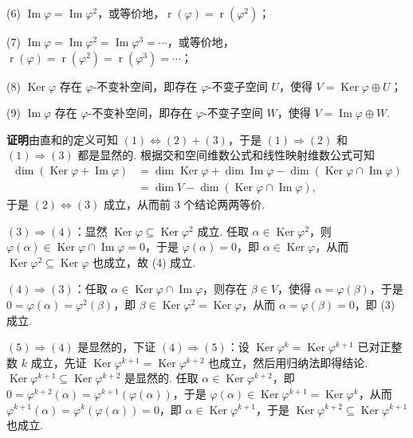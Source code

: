 \documentclass[UTF8,12pt,a4paper,fontset=fandol]{ctexart}
\begin{document}
(6) $\operatorname{Im}\varphi=\operatorname{Im}\varphi^2$，或等价地，$\operatorname{r}(\varphi)=\operatorname{r}(\varphi^2)$；

(7) $\operatorname{Im}\varphi=\operatorname{Im}\varphi^2=\operatorname{Im}\varphi^3=\cdots$，或等价地，$\operatorname{r}(\varphi)=\operatorname{r}(\varphi^2)=\operatorname{r}(\varphi^3)=\cdots$；

(8) $\operatorname{Ker}\varphi$ 存在 $\varphi$-不变补空间，即存在 $\varphi$-不变子空间 $U$，使得 $V=\operatorname{Ker}\varphi\oplus U$；

(9) $\operatorname{Im}\varphi$ 存在 $\varphi$-不变补空间，即存在 $\varphi$-不变子空间 $W$，使得 $V=\operatorname{Im}\varphi\oplus W$.

\noindent\textbf{证明}\quad 由直和的定义可知 $(1)\Leftrightarrow(2)+(3)$，于是 $(1)\Rightarrow(2)$ 和 $(1)\Rightarrow(3)$ 都是显然的. 根据交和空间维数公式和线性映射维数公式可知
\[
\begin{aligned}
\dim(\operatorname{Ker}\varphi+\operatorname{Im}\varphi)
&=\dim\operatorname{Ker}\varphi+\dim\operatorname{Im}\varphi-\dim(\operatorname{Ker}\varphi\cap\operatorname{Im}\varphi)\\
&=\dim V-\dim(\operatorname{Ker}\varphi\cap\operatorname{Im}\varphi),
\end{aligned}
\]
于是 $(2)\Leftrightarrow(3)$ 成立，从而前 3 个结论两两等价.

$(3)\Rightarrow(4)$：显然 $\operatorname{Ker}\varphi\subseteq\operatorname{Ker}\varphi^2$ 成立. 任取 $\alpha\in\operatorname{Ker}\varphi^2$，则 $\varphi(\alpha)\in\operatorname{Ker}\varphi\cap\operatorname{Im}\varphi=0$，于是 $\varphi(\alpha)=0$，即 $\alpha\in\operatorname{Ker}\varphi$，从而 $\operatorname{Ker}\varphi^2\subseteq\operatorname{Ker}\varphi$ 也成立，故 (4) 成立.

$(4)\Rightarrow(3)$：任取 $\alpha\in\operatorname{Ker}\varphi\cap\operatorname{Im}\varphi$，则存在 $\beta\in V$，使得 $\alpha=\varphi(\beta)$，于是 $0=\varphi(\alpha)=\varphi^2(\beta)$，即 $\beta\in\operatorname{Ker}\varphi^2=\operatorname{Ker}\varphi$，从而 $\alpha=\varphi(\beta)=0$，即 (3) 成立.

$(5)\Rightarrow(4)$ 是显然的，下证 $(4)\Rightarrow(5)$：设 $\operatorname{Ker}\varphi^k=\operatorname{Ker}\varphi^{k+1}$ 已对正整数 $k$ 成立，先证 $\operatorname{Ker}\varphi^{k+1}=\operatorname{Ker}\varphi^{k+2}$ 也成立，然后用归纳法即得结论. $\operatorname{Ker}\varphi^{k+1}\subseteq\operatorname{Ker}\varphi^{k+2}$ 是显然的. 任取 $\alpha\in\operatorname{Ker}\varphi^{k+2}$，即 $0=\varphi^{k+2}(\alpha)=\varphi^{k+1}(\varphi(\alpha))$，于是 $\varphi(\alpha)\in\operatorname{Ker}\varphi^{k+1}=\operatorname{Ker}\varphi^k$，从而 $\varphi^{k+1}(\alpha)=\varphi^k(\varphi(\alpha))=0$，即 $\alpha\in\operatorname{Ker}\varphi^{k+1}$，于是 $\operatorname{Ker}\varphi^{k+2}\subseteq\operatorname{Ker}\varphi^{k+1}$ 也成立.
\end{document}
